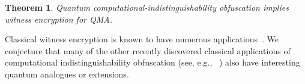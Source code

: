 \documentclass[11pt]{amsart}
\numberwithin{equation}{section}
\newtheorem{theorem}{Theorem}
\begin{document}
\begin{theorem}
Quantum computational-indistinguishability obfuscation implies witness encryption for QMA.
\end{theorem}

\noindent Classical witness encryption is known to have numerous applications~\cite{GGSW13}. We conjecture that many of the other recently discovered classical applications of computational indistinguishability obfuscation (see, e.g., ~\cite{SW14}) also have interesting quantum analogues or extensions.


\end{document}
